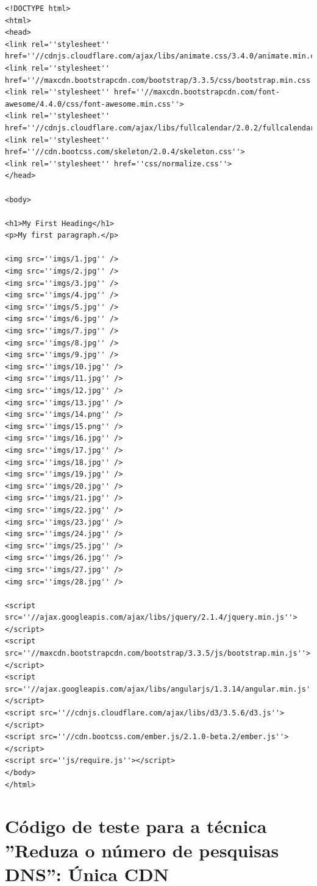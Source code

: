 \begin{apendicesenv}
\begin{lstlisting}
<!DOCTYPE html>
<html>
<head>
<link rel=''stylesheet'' href=''//cdnjs.cloudflare.com/ajax/libs/animate.css/3.4.0/animate.min.css''>
<link rel=''stylesheet'' href=''//maxcdn.bootstrapcdn.com/bootstrap/3.3.5/css/bootstrap.min.css''>
<link rel=''stylesheet'' href=''//maxcdn.bootstrapcdn.com/font-awesome/4.4.0/css/font-awesome.min.css''>	
<link rel=''stylesheet'' href=''//cdnjs.cloudflare.com/ajax/libs/fullcalendar/2.0.2/fullcalendar.js''>
<link rel=''stylesheet'' href=''//cdn.bootcss.com/skeleton/2.0.4/skeleton.css''>
<link rel=''stylesheet'' href=''css/normalize.css''>
</head>

<body>

<h1>My First Heading</h1>
<p>My first paragraph.</p>

<img src=''imgs/1.jpg'' />
<img src=''imgs/2.jpg'' />
<img src=''imgs/3.jpg'' />
<img src=''imgs/4.jpg'' />
<img src=''imgs/5.jpg'' />
<img src=''imgs/6.jpg'' />
<img src=''imgs/7.jpg'' />
<img src=''imgs/8.jpg'' />
<img src=''imgs/9.jpg'' />
<img src=''imgs/10.jpg'' />
<img src=''imgs/11.jpg'' />
<img src=''imgs/12.jpg'' />
<img src=''imgs/13.jpg'' />
<img src=''imgs/14.png'' />
<img src=''imgs/15.png'' />
<img src=''imgs/16.jpg'' />
<img src=''imgs/17.jpg'' />
<img src=''imgs/18.jpg'' />
<img src=''imgs/19.jpg'' />
<img src=''imgs/20.jpg'' />
<img src=''imgs/21.jpg'' />
<img src=''imgs/22.jpg'' />
<img src=''imgs/23.jpg'' />
<img src=''imgs/24.jpg'' />
<img src=''imgs/25.jpg'' />
<img src=''imgs/26.jpg'' />
<img src=''imgs/27.jpg'' />
<img src=''imgs/28.jpg'' />

<script src=''//ajax.googleapis.com/ajax/libs/jquery/2.1.4/jquery.min.js''></script>
<script src=''//maxcdn.bootstrapcdn.com/bootstrap/3.3.5/js/bootstrap.min.js''></script>
<script src=''//ajax.googleapis.com/ajax/libs/angularjs/1.3.14/angular.min.js''></script>
<script src=''//cdnjs.cloudflare.com/ajax/libs/d3/3.5.6/d3.js''></script>
<script src=''//cdn.bootcss.com/ember.js/2.1.0-beta.2/ember.js''></script>
<script src=''js/require.js''></script>	
</body>
</html>

\end{lstlisting}

\chapter{Código de teste para a técnica ''Reduza o número de pesquisas DNS'': Única CDN}
\label{apend:codigo_reduzaonumerodepesquisasdns_unic}	


\end{apendicesenv}
